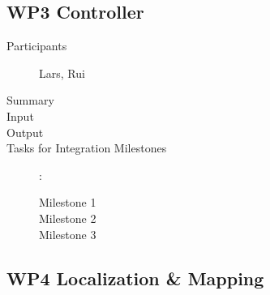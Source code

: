 \documentclass[11pt,a4paper]{article}
\begin{document}
\subsection{WP3 Controller}

\begin{description}
\item[Participants] Lars, Rui
\item[Summary]
\item[Input]
\item[Output]
\item[Tasks for Integration Milestones]:\
	\begin{description}
		\item[Milestone 1]
		\item[Milestone 2]
		\item[Milestone 3] 
	\end{description}	 
\end{description}

\subsection{WP4 Localization \& Mapping}
\end{document}
